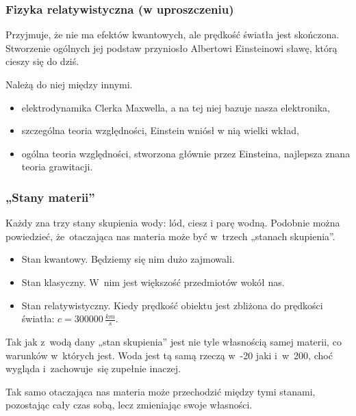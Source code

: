 \documentclass[10pt,t]{beamer}
\begin{document}
\begin{frame}
  \frametitle{Fizyka relatywistyczna (w uproszczeniu)}


  Przyjmuje, że nie ma efektów kwantowych, ale prędkość światła jest
  skończona. Stworzenie ogólnych jej podstaw przyniosło Albertowi
  Einsteinowi sławę, którą cieszy się do dziś.


  Należą do niej między innymi.
  \begin{itemize}
    \RaggedRight

  \item elektrodynamika Clerka Maxwella, a na tej niej bazuje nasza
    elektronika,

  \item szczególna teoria względności, Einstein wniósł w nią wielki
    wkład,

  \item ogólna teoria względności, stworzona głównie przez Einsteina,
    najlepsza znana teoria grawitacji.

  \end{itemize}

\end{frame}





\begin{frame}
  \frametitle{„Stany materii”}


  Każdy zna trzy stany skupienia wody: lód, ciesz i parę wodną.
  Podobnie można powiedzieć, że~otaczająca nas materia może być
  w~trzech „stanach skupienia”.

  \begin{itemize}
    \RaggedRight

  \item Stan kwantowy. Będziemy się nim dużo zajmowali.

  \item Stan klasyczny. W~nim jest większość przedmiotów wokół nas.

  \item Stan relatywistyczny. Kiedy prędkość obiektu jest zbliżona do
    prędkości światła: $c = 3 00 000 \, \frac{ \si{km} }{ \si{s} }$.

  \end{itemize}

  Tak jak z~wodą dany „stan skupienia” jest nie tyle własnością
  samej materii, co warunków w~których jest. Woda jest tą samą rzeczą
  w~-20\textcelsius{ } jaki i~w~200\textcelsius, choć wygląda
  i~zachowuje~się zupełnie inaczej.

  Tak samo otaczająca nas materia może przechodzić między tymi
  stanami, pozostając cały czas sobą, lecz zmieniając swoje własności.

\end{frame}
\end{document}
